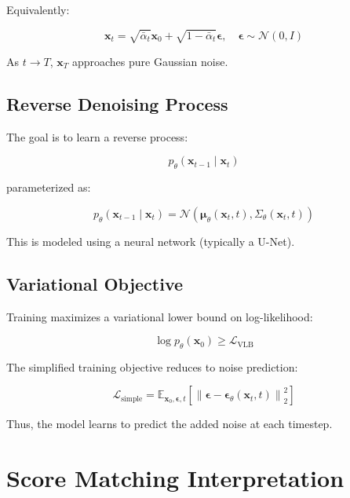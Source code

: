 Equivalently:

\begin{equation}
\mathbf{x}_t =
\sqrt{\bar{\alpha}_t}\mathbf{x}_0 +
\sqrt{1 - \bar{\alpha}_t}\boldsymbol{\epsilon},
\quad
\boldsymbol{\epsilon} \sim \mathcal{N}(0,I)
\end{equation}

As $t \to T$, $\mathbf{x}_T$ approaches pure Gaussian noise.

\subsection{Reverse Denoising Process}

The goal is to learn a reverse process:

\begin{equation}
p_\theta(\mathbf{x}_{t-1} \mid \mathbf{x}_t)
\end{equation}

parameterized as:

\begin{equation}
p_\theta(\mathbf{x}_{t-1} \mid \mathbf{x}_t)
=
\mathcal{N}\left(
\boldsymbol{\mu}_\theta(\mathbf{x}_t, t),
\Sigma_\theta(\mathbf{x}_t, t)
\right)
\end{equation}

This is modeled using a neural network (typically a U-Net).

\subsection{Variational Objective}

Training maximizes a variational lower bound on log-likelihood:

\begin{equation}
\log p_\theta(\mathbf{x}_0)
\ge
\mathcal{L}_{\text{VLB}}
\end{equation}

The simplified training objective reduces to noise prediction:

\begin{equation}
\mathcal{L}_{\text{simple}} =
\mathbb{E}_{\mathbf{x}_0, \boldsymbol{\epsilon}, t}
\left[
\left\|
\boldsymbol{\epsilon}
-
\boldsymbol{\epsilon}_\theta(\mathbf{x}_t, t)
\right\|_2^2
\right]
\end{equation}

Thus, the model learns to predict the added noise at each timestep.
\section{Score Matching Interpretation}

